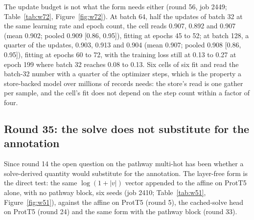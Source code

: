 The update budget is not what the form needs either (round 56, job 2449;
Table~\ref{tab:w72}, Figure~\ref{fig:w72}). At batch 64, half the updates of batch
32 at the same learning rate and epoch count, the cell reads 0.907, 0.892 and 0.907
(mean 0.902; pooled 0.909 [0.86, 0.95]), fitting at epochs 45 to 52; at batch 128, a
quarter of the updates, 0.903, 0.913 and 0.904 (mean 0.907; pooled 0.908 [0.86,
0.95]), fitting at epochs 60 to 72, with the training loss still at 0.13 to 0.27
at epoch 199 where batch 32 reaches 0.08 to 0.13. Six cells of six fit and read
the batch-32 number with a quarter of the optimizer steps, which is the property a
store-backed model over millions of records needs: the store's read is one gather
per sample, and the cell's fit does not depend on the step count within a factor
of four.




\subsection{Round 35: the solve does not substitute for the annotation}
\label{sec:round35}

Since round 14 the open question on the pathway multi-hot has been whether a
solve-derived quantity would substitute for the annotation. The layer-free form is the
direct test: the same $\log(1 + |v|)$ vector appended to the affine on ProtT5 alone,
with no pathway block, six seeds (job 2410; Table~\ref{tab:w51},
Figure~\ref{fig:w51}), against the affine on ProtT5 (round 5), the cached-solve head on
ProtT5 (round 24) and the same form with the pathway block (round 33).




